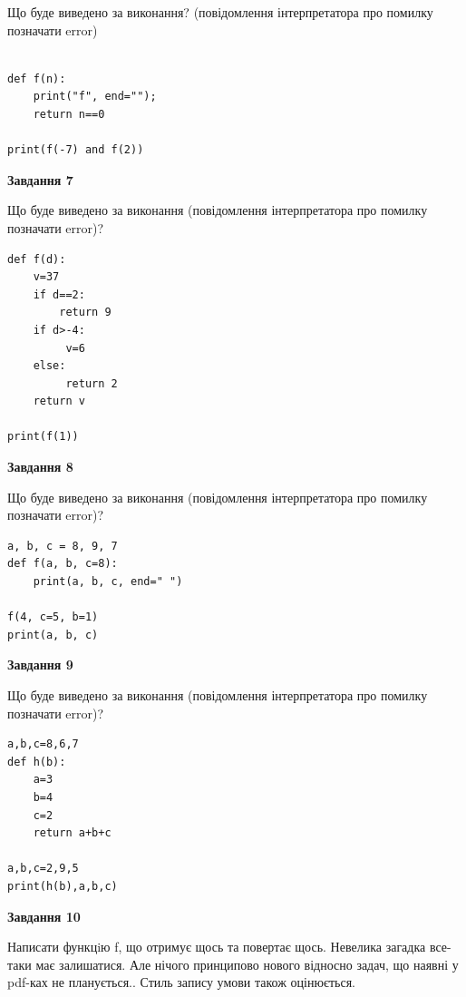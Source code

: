 \documentclass[12pt, ukrainian]{article}
\begin{document}
{\begin {large}
Що буде виведено за виконання? (повідомлення інтерпретатора про помилку позначати error)\par
\begin{verbatim}

def f(n):
    print("f", end="");
    return n==0

print(f(-7) and f(2))
\end{verbatim}

{\begin {center}\textbf{Завдання 7}\end {center}}

Що буде виведено за виконання (повідомлення інтерпретатора про помилку позначати error)?\par
\begin{verbatim}
def f(d):
    v=37
    if d==2: 
        return 9
    if d>-4:
         v=6
    else:
         return 2
    return v

print(f(1))
\end{verbatim}

{\begin {center}\textbf{Завдання 8}\end {center}}

Що буде виведено за виконання (повідомлення інтерпретатора про помилку позначати error)?\par
\begin{verbatim}
a, b, c = 8, 9, 7
def f(a, b, c=8):
    print(a, b, c, end=" ")

f(4, c=5, b=1)
print(a, b, c)
\end{verbatim}

{\begin {center}\textbf{Завдання 9}\end {center}}

Що буде виведено за виконання (повідомлення інтерпретатора про помилку позначати error)?\par
\begin{verbatim}
a,b,c=8,6,7
def h(b):
    a=3
    b=4
    c=2
    return a+b+c

a,b,c=2,9,5
print(h(b),a,b,c)
\end{verbatim}

{\begin {center}\textbf{Завдання 10}\end {center}}


Написати функцiю f, що отримує щось та повертає щось. Невелика загадка все-таки має залишатися. Але нічого принципово нового відносно задач, що наявні у pdf-ках не планується.. Стиль запису умови також оцінюється.\par
\end {large}}
\newpage
\end{document}
